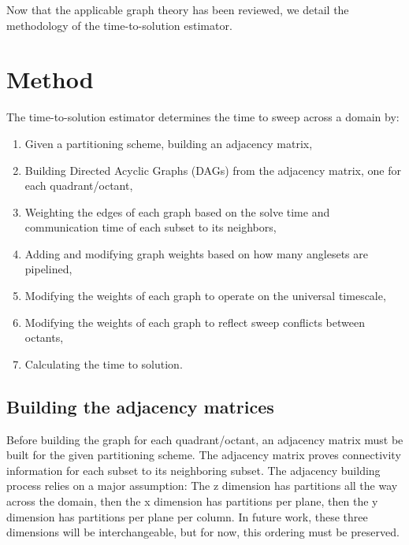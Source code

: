 
Now that the applicable graph theory has been reviewed, we detail the methodology of the time-to-solution estimator.
 
\section{Method}
The time-to-solution estimator determines the time to sweep across a domain by:
\begin{enumerate}
	\item Given a partitioning scheme, building an adjacency matrix,
	\item Building Directed Acyclic Graphs (DAGs) from the adjacency matrix, one for each quadrant/octant,
	\item Weighting the edges of each graph based on the solve time and communication time of each subset to its neighbors,
     \item Adding and modifying graph weights based on how many anglesets are pipelined,
	\item Modifying the weights of each graph to operate on the universal timescale,
	\item Modifying the weights of each graph to reflect sweep conflicts between octants, 
	\item Calculating the time to solution.
\end{enumerate}

\subsection{Building the adjacency matrices}

Before building the graph for each quadrant/octant, an adjacency matrix must be built for the given partitioning scheme. 
The adjacency matrix proves connectivity information for each subset to its neighboring subset. 
The adjacency building process relies on a major assumption: The z dimension has partitions all the way across the domain, then the x dimension has partitions per plane, then the y dimension has partitions per plane per column. 
In future work, these three dimensions will be interchangeable, but for now, this ordering must be preserved. 

